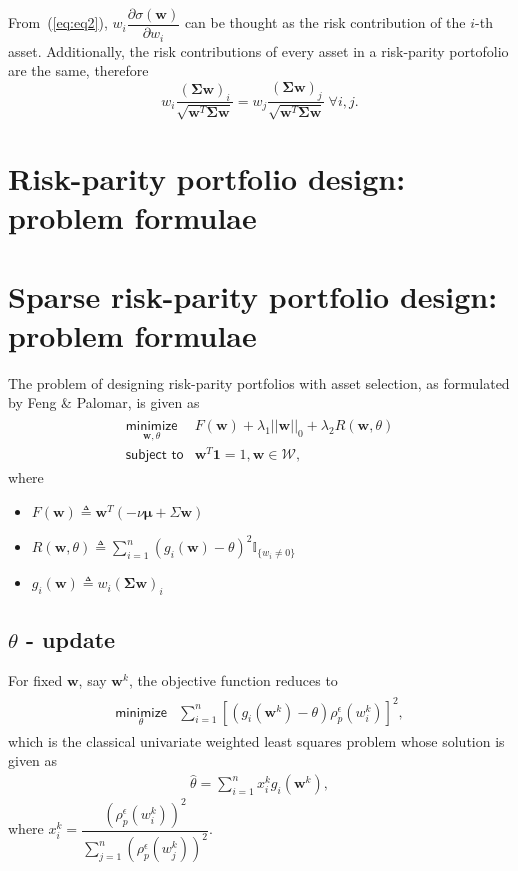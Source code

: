 \documentclass{article}
\begin{document}
From~(\ref{eq:eq2}), $w_{i}\dfrac{\partial \sigma(\bm{w})}{\partial w_i}$ can be
thought as the risk contribution of the $i$-th asset. Additionally, the risk
contributions of every asset in a risk-parity portofolio are the same, therefore
\begin{equation}
w_i \dfrac{(\bm{\Sigma}{\bm{w}})_{i}}{\sqrt{\bm{w}^{T}\bm{\Sigma}\bm{w}}} =
w_j \dfrac{(\bm{\Sigma}{\bm{w}})_{j}}{\sqrt{\bm{w}^{T}\bm{\Sigma}\bm{w}}}~\forall i, j.
\end{equation}

\section{Risk-parity portfolio design: problem formulae}

\section{Sparse risk-parity portfolio design: problem formulae}
The problem of designing risk-parity portfolios with asset selection, as formulated by Feng \& Palomar,
is given as
\begin{align}\begin{array}{ll}
\underset{\bm{w}, \theta}{\textsf{minimize}} & F(\bm{w}) + \lambda_{1}||\bm{w}||_{0} + \lambda_{2}R(\bm{w}, \theta)\\
\textsf{subject to} & \bm{w}^{T}\bm{1} = 1, \bm{w} \in \mathcal{W},
\end{array}\end{align}
where
\begin{itemize}
    \item $F(\bm{w}) \triangleq \bm{w}^{T}(- \nu \bm{\mu} + \Sigma\bm{w})$
    \item $R(\bm{w}, \theta) \triangleq \sum_{i=1}^{n}(g_i(\bm{w}) - \theta)^{2}\mathbb{I}_{\{w_i \neq 0\}}$
    \item $g_i(\bm{w}) \triangleq w_i\left(\bm{\Sigma}\bm{w}\right)_{i}$
\end{itemize}

\subsection{$\theta$ - update}
For fixed $\bm{w}$, say $\bm{w}^{k}$, the objective function reduces to
\begin{align}\begin{array}{ll}
\underset{\theta}{\textsf{minimize}} & \sum_{i=1}^{n}\left[\left(g_i(\bm{w}^{k}) -
                                       \theta\right)\rho^{\epsilon}_{p}\left(w^{k}_{i}\right)\right]^2,
\end{array}\end{align}
which is the classical univariate weighted least squares problem whose solution is given as
\begin{align}
\hat{\theta} = \sum_{i=1}^{n}x^{k}_{i}g_{i}\left(\bm{w}^{k}\right),
\end{align}
where $x^{k}_{i} = \dfrac{\left(\rho^{\epsilon}_p\left(w^{k}_i\right)\right)^{2}}
                  {\sum^{n}_{j = 1}\left(\rho^{\epsilon}_{p}\left(w^{k}_j\right)\right)^{2}}$.
\end{document}
